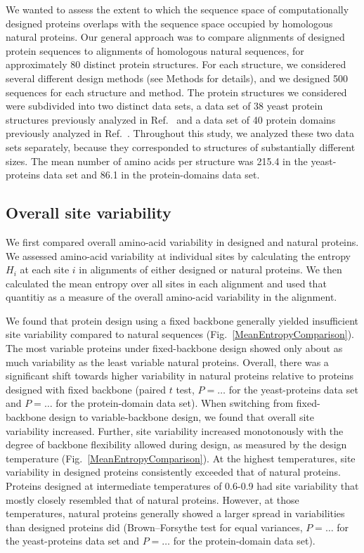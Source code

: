 \documentclass[12pt]{article}
\begin{document}
We wanted to assess the extent to which the sequence space of computationally designed proteins overlaps with the sequence space occupied by homologous natural proteins. Our general approach was to compare alignments of designed protein sequences to alignments of homologous natural sequences, for approximately 80 distinct protein structures. For each structure, we considered several different design methods (see Methods for details), and we designed 500 sequences for each structure and method. The protein structures we considered were subdivided into two distinct data sets, a data set of 38 yeast protein structures previously analyzed in Ref.\ \cite{Ramsey2011} and a data set of 40 protein domains previously analyzed in  Ref.\ \cite{OllikainenKortemme}. Throughout this study, we analyzed these two data sets separately, because they corresponded to structures of substantially different sizes. The mean number of amino acids per structure was 215.4 in the yeast-proteins data set and 86.1 in the protein-domains data set.

\subsection{Overall site variability}
\label{SiteVariability}

We first compared overall amino-acid variability in designed and natural proteins. We assessed amino-acid variability at individual sites by calculating the entropy $H_i$ at each site $i$ in alignments of either designed or natural proteins. We then calculated the mean entropy over all sites in each alignment and used that quantitiy as a measure of the overall amino-acid variability in the alignment.

We found that protein design using a fixed backbone generally yielded insufficient site variability compared to natural sequences (Fig.~\ref{MeanEntropyComparison}). The most variable proteins under fixed-backbone design showed only about as much variability as the least variable natural proteins. Overall, there was a significant shift towards higher variability in natural proteins relative to proteins designed with fixed backbone (paired $t$ test, {\color{red}$P=\dots$} for the yeast-proteins data set and {\color{red}$P=\dots$} for the protein-domain data set). When switching from fixed-backbone design to variable-backbone design, we found that overall site variability increased. Further, site variability increased monotonously with the degree of backbone flexibility allowed during design, as measured by the design temperature (Fig.~\ref{MeanEntropyComparison}). At the highest temperatures, site variability in designed proteins consistently exceeded that of natural proteins. Proteins designed at intermediate temperatures of 0.6-0.9 had site variability that mostly closely resembled that of natural proteins. However, at those temperatures, natural proteins generally showed a larger spread in variabilities than designed proteins did (Brown–Forsythe test for equal variances, {\color{red}$P=\dots$} for the yeast-proteins data set and {\color{red}$P=\dots$} for the protein-domain data set).
\end{document}
